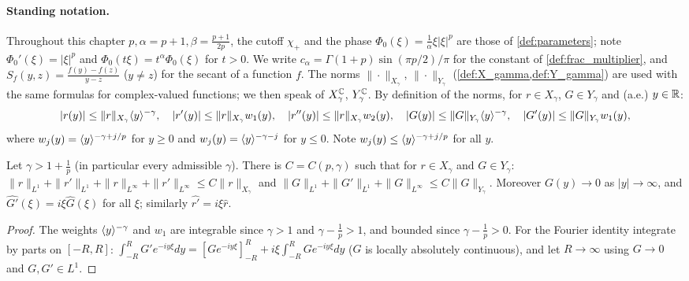 
\paragraph{Standing notation.}
Throughout this chapter $p,\alpha=p+1,\beta=\frac{p+1}{2p}$, the cutoff $\chi_+$ and the phase
$\Phi_0(\xi)=\frac1\alpha\xi|\xi|^p$ are those of \cref{def:parameters}; note $\Phi_0'(\xi)=|\xi|^p$
and $\Phi_0(t\xi)=t^{\alpha}\Phi_0(\xi)$ for $t>0$. We write $c_\alpha=\Gamma(1+p)\sin(\pi p/2)/\pi$ for the
constant of \cref{def:frac_multiplier}, and $S_f(y,z)=\frac{f(y)-f(z)}{y-z}$ ($y\neq z$) for the secant of
a function $f$. The norms $\|\cdot\|_{X_\gamma}$, $\|\cdot\|_{Y_\gamma}$ (\cref{def:X_gamma,def:Y_gamma}) are used
with the same formulas for complex-valued functions; we then speak of $X_\gamma^{\mathbb{C}}$, $Y^{\mathbb{C}}_\gamma$.
By definition of the norms, for $r\in X_\gamma$, $G\in Y_\gamma$ and (a.e.) $y\in\mathbb{R}$:
\[
  |r(y)|\le\|r\|_{X_\gamma}\langle y \rangle^{-\gamma},\quad
  |r'(y)|\le\|r\|_{X_\gamma}w_1(y),\quad |r''(y)|\le\|r\|_{X_\gamma}w_2(y),\quad
  |G(y)|\le\|G\|_{Y_\gamma}\langle y \rangle^{-\gamma},\quad |G'(y)|\le\|G\|_{Y_\gamma}w_1(y),
\]
where $w_j(y)=\langle y \rangle^{-\gamma+j/p}$ for $y\ge0$ and $w_j(y)=\langle y \rangle^{-\gamma-j}$ for $y\le0$. Note
$w_j(y)\le\langle y \rangle^{-\gamma+j/p}$ for all $y$.

\begin{lemma}
  \label{lem:c08_L1_embedding}
  Let $\gamma>1+\frac1p$ (in particular every admissible $\gamma$). There is $C=C(p,\gamma)$ such that
  for $r\in X_\gamma$ and $G\in Y_\gamma$:
  $\|r\|_{L^1}+\|r'\|_{L^1}+\|r\|_{L^\infty}+\|r'\|_{L^\infty}\le C\|r\|_{X_\gamma}$ and
  $\|G\|_{L^1}+\|G'\|_{L^1}+\|G\|_{L^\infty}\le C\|G\|_{Y_\gamma}$. Moreover $G(y)\to0$ as $|y|\to\infty$, and
  $\widehat{G'}(\xi)=i\xi\widehat G(\xi)$ for all $\xi$; similarly $\widehat{r'}=i\xi\widehat r$.
\end{lemma}
\begin{proof}
  The weights $\langle y \rangle^{-\gamma}$ and $w_1$ are integrable since $\gamma>1$ and $\gamma-\frac1p>1$, and bounded
  since $\gamma-\frac1p>0$. For the Fourier identity integrate by parts on $[-R,R]$:
  $\int_{-R}^RG'e^{-iy\xi}dy=[Ge^{-iy\xi}]_{-R}^R+i\xi\int_{-R}^RGe^{-iy\xi}dy$ ($G$ is locally absolutely
  continuous), and let $R\to\infty$ using $G\to0$ and $G,G'\in L^1$.
\end{proof}

